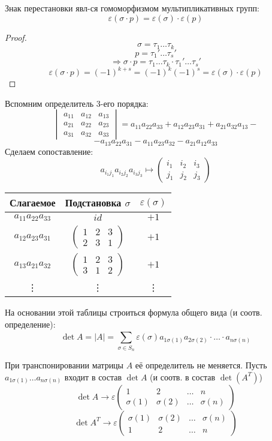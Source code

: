 \begin{statement}
Знак перестановки явл-ся гомоморфизмом мультипликативных групп:
\[
\varepsilon(\sigma \cdot p) = \varepsilon(\sigma) \cdot \varepsilon(p)
\]
\end{statement}
\begin{proof}
\[
\sigma = \tau_1 \ldots \tau_k
\]
\[
p = \tau_1' \ldots \tau_s'
\]
\[
\Rightarrow \sigma \cdot p = \tau_1 \ldots \tau_k \cdot \tau_1' \ldots \tau_s'
\]
\[
\varepsilon(\sigma \cdot p) = (-1)^{k + s} = (-1)^{k} (-1)^{s} = \varepsilon(\sigma) \cdot \varepsilon(p)
\]
\end{proof}
Вспомним определитель 3-его порядка:
\[
  \begin{vmatrix}a_{11} & a_{12} & a_{13} \\ a_{21} & a_{22} & a_{23} \\ a_{31} & a_{32} & a_{33} \end{vmatrix} = a_{11}a_{22}a_{33} + a_{12}a_{23}a_{31} + a_{21}a_{32}a_{13} - 
\]
\[
  - a_{13}a_{22}a_{31} - a_{11}a_{23}a_{32} - a_{21}a_{12}a_{33}
\]
Сделаем сопоставление:
\[
  a_{i_1 j_1} a_{i_2 j_2} a_{i_3 j_3} \mapsto \begin{pmatrix}i_1 & i_2 & i_3 \\ j_1 & j_2 & j_3 \end{pmatrix}
\]
\begin{center}
\begin{tabular}{ |c|c|c| } 
 \hline
  Слагаемое & Подстановка $\sigma$ & $\varepsilon(\sigma)$ \\
 \hline
  $a_{11} a_{22} a_{33}$ & $id$ & $+1$ \\
  $a_{12}a_{23}a_{31}$ & $\begin{pmatrix}1 & 2 & 3 \\ 2 & 3 & 1\end{pmatrix}$ & $+1$ \\
  $a_{13}a_{21}a_{32}$ & $\begin{pmatrix}1 & 2 & 3 \\ 3 & 1 & 2 \end{pmatrix}$ & $+1$ \\
  \vdots & \vdots & \vdots \\
 \hline
\end{tabular}
\end{center}
На основании этой таблицы строиться формула общего вида (и соотв. определение):
\[
  \det A = \left|A\right| = \sum_{\sigma \in S_n}^{} \varepsilon(\sigma) a_{1 \sigma(1)} a_{2 \sigma(2)} \cdot \ldots \cdot a_{n \sigma(n)}
\]
\begin{statement}
При транспонировании матрицы $A$ её определитель не меняется. Пусть $a_{1 \sigma(1)}\ldots a_{n \sigma(n)}$ входит в состав $\det A$ (и соотв. в состав $\det (A^{T})$)
\[
  \det A \rightarrow \varepsilon\begin{pmatrix}1 & 2 & \ldots & n \\ \sigma(1) & \sigma(2) & \ldots & \sigma(n) \end{pmatrix}
\]
\[
  \det A^{T} \rightarrow \varepsilon\begin{pmatrix}\sigma(1) & \sigma(2) & \ldots & \sigma(n) \\ 1 & 2 & \ldots & n \end{pmatrix}
\]
\end{statement}
